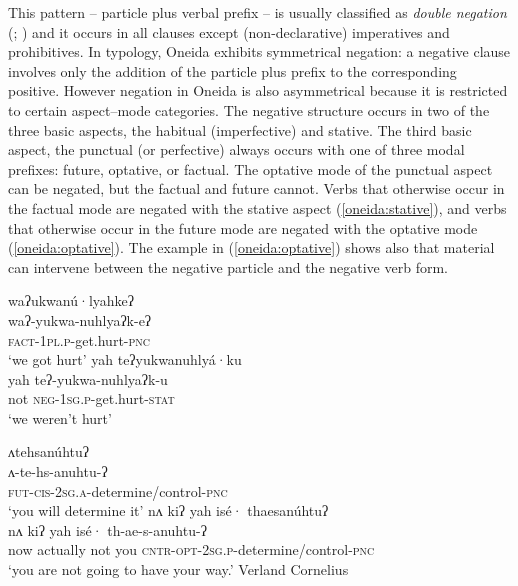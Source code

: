 \documentclass[output=paper,colorlinks,citecolor=brown]{langscibook}
\begin{document}
This pattern -- particle plus verbal prefix -- is usually classified as \textit{double negation} (\citealt{Dryer2013-wals143}; \citealt{AlsenoyAuwera2014}) and it occurs in all clauses except (non-declarative) imperatives and prohibitives. 
In  typology, Oneida exhibits symmetrical negation: a negative clause involves only the addition of the particle plus prefix to the corresponding positive. However negation in Oneida is also asymmetrical because it is restricted to certain aspect--mode categories. The negative structure occurs in two of the three basic aspects, the habitual (imperfective) and stative. The third basic aspect, the punctual (or perfective) always occurs with one of three modal prefixes: future, optative, or factual. The optative mode of the punctual aspect can be negated, but the factual and future cannot. Verbs that otherwise occur in the factual mode are negated with the stative aspect (\ref{oneida:stative}), and verbs that otherwise occur in the future mode are negated with the optative mode (\ref{oneida:optative}). The example in (\ref{oneida:optative}) shows also that material can intervene between the negative particle and the negative verb form.

\ea\label{oneida:stative}
    \ea\label{oneida:stative a}
        \glll waʔukwanú·lyahkeʔ \\
        waʔ-yukwa-nuhlyaʔk-eʔ \\
        \textsc{fact-1pl.p}-get.hurt-\textsc{pnc} \\
        \glt `we got hurt'
    \ex\label{oneida:stative b}
        \glll yah teʔyukwanuhlyá·ku \\
        yah teʔ-yukwa-nuhlyaʔk-u \\
        not \textsc{neg-1sg.p}-get.hurt-\textsc{stat} \\
        \glt `we weren't hurt'	\citep[538]{MichelsonDoxtator2002}
    \z
\z

\ea\label{oneida:optative}
    \ea\label{oneida:optative a}
        \glll ʌtehsanúhtuʔ \\
        ʌ-te-hs-anuhtu-ʔ \\
        \textsc{fut-cis-2sg.a}-determine/control-\textsc{pnc} \\
        \glt `you will determine it' \citep[108]{MichelsonDoxtator2002}
    \ex\label{oneida:optative b}
        \glll nʌ kiʔ yah isé· thaesanúhtuʔ \\
        nʌ kiʔ yah isé· th-ae-s-anuhtu-ʔ \\
        now actually not you \textsc{cntr-opt-2sg.p}-determine/control-\textsc{pnc} \\
        \glt `you are not going to have your way.'	Verland Cornelius \citep[338 (256)]{MichelsonEtAl2016}
    \z 
\z 
\end{document}

